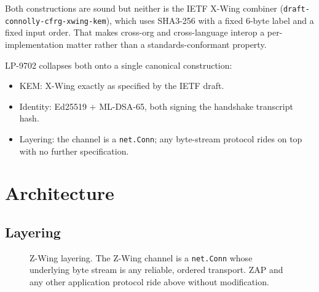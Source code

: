 \documentclass[11pt,a4paper]{article}
\begin{document}
Both constructions are sound but neither is the IETF X-Wing combiner
(\texttt{draft-connolly-cfrg-xwing-kem}), which uses SHA3-256 with a
fixed 6-byte label and a fixed input order. That makes cross-org and
cross-language interop a per-implementation matter rather than a
standards-conformant property.

LP-9702 collapses both onto a single canonical construction:
\begin{itemize}[leftmargin=*]
  \item KEM: X-Wing exactly as specified by the IETF draft.
  \item Identity: Ed25519 $+$ ML-DSA-65, both signing the handshake
        transcript hash.
  \item Layering: the channel is a \texttt{net.Conn}; any byte-stream
        protocol rides on top with no further specification.
\end{itemize}

\section{Architecture}

\subsection{Layering}

\begin{figure}[H]
\centering
{}
\caption{Z-Wing layering. The Z-Wing channel is a \texttt{net.Conn} whose
underlying byte stream is any reliable, ordered transport. ZAP and any
other application protocol ride above without modification.}
\label{fig:layering}
\end{figure}
\end{document}
